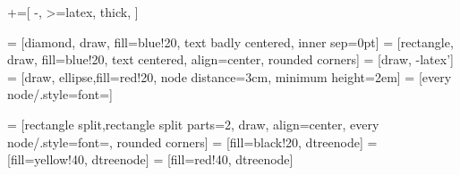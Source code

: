 \usepackage{tikz}
\usepackage{pgfplots}
\pgfplotsset{compat=1.12}
\usetikzlibrary{arrows, positioning, er, fit, backgrounds,calc,shapes,decorations.pathreplacing}
+=[
	-,
	>=latex, 
	thick,
]



 = [diamond, draw, fill=blue!20, text badly centered, inner sep=0pt]
 = [rectangle, draw, fill=blue!20, text centered, align=center, rounded corners]
 = [draw, -latex']
 = [draw, ellipse,fill=red!20, node distance=3cm, minimum height=2em]
 = [every node/.style={font=\scriptsize}]

 = [rectangle split,rectangle split parts=2, draw, align=center, every node/.style={font=\scriptsize}, rounded corners]
 = [fill=black!20, dtreenode]
 = [fill=yellow!40, dtreenode]
 = [fill=red!40, dtreenode]

